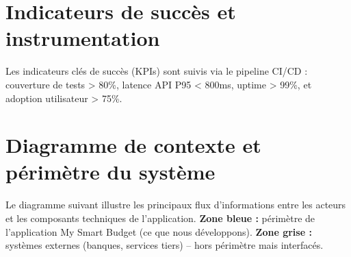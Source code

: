 \section{Indicateurs de succès et instrumentation}

Les indicateurs clés de succès (KPIs) sont suivis via le pipeline CI/CD : couverture de tests > 80\%, latence API P95 < 800ms, uptime > 99\%, et adoption utilisateur > 75\%.

\section{Diagramme de contexte et périmètre du système}

\begin{tcolorbox}[colback=gray!5!white,colframe=gray!60!black,title=\textbf{Description du diagramme et périmètre}]
Le diagramme suivant illustre les principaux flux d'informations entre les acteurs et les composants techniques de l'application.  
\textbf{Zone bleue :} périmètre de l'application My Smart Budget (ce que nous développons).  
\textbf{Zone grise :} systèmes externes (banques, services tiers) -- hors périmètre mais interfacés.
\end{tcolorbox}

